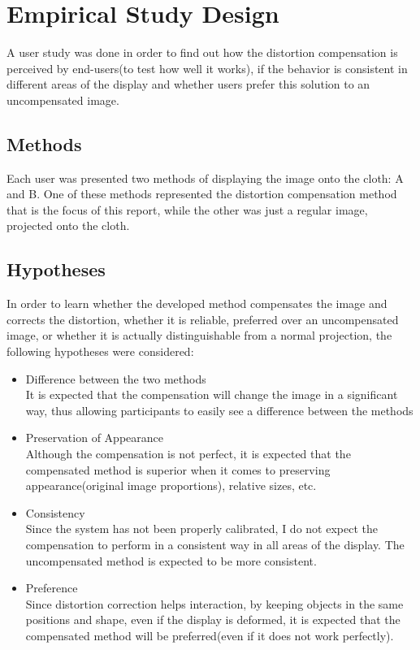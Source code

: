 \documentclass[]{article}
\begin{document}
\clearpage
\section{Empirical Study Design}
\label{sec:EmpiricalStudy}

A user study was done in order to find out how the distortion compensation is perceived by end-users(to test how well it works), if the behavior is consistent in different areas of the display and whether users prefer this solution to an uncompensated image. 

\subsection{Methods}

Each user was presented two methods of displaying the image onto the cloth: A and B. One of these methods represented the distortion compensation method that is the focus of this report, while the other was just a regular image, projected onto the cloth. 

\subsection{Hypotheses}
\label{sec:hypotheses}
In order to learn whether the developed method compensates the image and corrects the distortion, whether it is reliable, preferred over an uncompensated image, or whether it is actually distinguishable from a normal projection, the following hypotheses were considered:

\begin{itemize}
\item Difference between the two methods\\

It is expected that the compensation will change the image in a significant way, thus allowing participants to easily see a difference between the methods
\item Preservation of Appearance\\

Although the compensation is not perfect, it is expected that the compensated method is superior when it comes to preserving appearance(original image proportions), relative sizes, etc.
\item Consistency\\

Since the system has not been properly calibrated, I do not expect the compensation to perform in a consistent way in all areas of the display. The uncompensated method is expected to be more consistent.
\item Preference\\

Since distortion correction helps interaction, by keeping objects in the same positions and shape, even if the display is deformed, it is expected that the compensated method will be preferred(even if it does not work perfectly).
\end{itemize}
\end{document}
